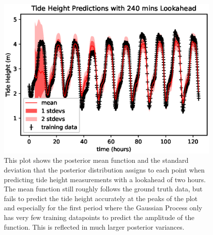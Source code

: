 \documentclass{article}
\begin{document}
                \begin{figure}[ht!]
                    \includegraphics[width=\linewidth,height=\textheight,keepaspectratio]{tide_height_lookahead_240mins.eps}
                    \caption{This plot shows the posterior mean function and the standard deviation that the posterior distribution assigns to each point when predicting tide height measurements with a lookahead of two hours. The mean function still roughly follows the ground truth data, but fails to predict the tide height accurately at the peaks of the plot and especially for the first period where the Gaussian Process only has very few training datapoints to predict the amplitude of the function. This is reflected in much larger posterior variances.}
                    \label{plot_tideheightlookahead_240mins}
                \end{figure}
\end{document}
